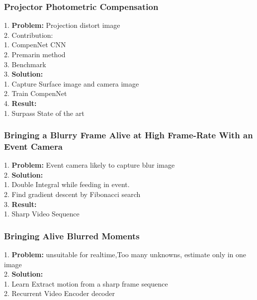 \subsubsection{Projector Photometric Compensation}
    1. {\bf Problem:} Projection distort image \\
    2. Contribution:  \\
        1. CompenNet CNN \\
        2. Premarin method \\
        3. Benchmark \\
    3. {\bf Solution:} \\
        1. Capture Surface image and camera image \\
        2. Train CompenNet \\
    4. {\bf Result:} \\
        1. Surpass State of the art \\
\subsubsection{Bringing a Blurry Frame Alive at High Frame-Rate With an Event Camera}
    1. {\bf Problem:} Event camera likely to capture blur image \\
    2. {\bf Solution:}  \\
        1. Double Integral while feeding in event. \\
        2. Find gradient descent by Fibonacci search \\
    3. {\bf Result:} \\
        1. Sharp Video Sequence \\
\subsubsection{Bringing Alive Blurred Moments}
    1. {\bf Problem:} unsuitable for realtime,Too many unknowns, estimate only in one image \\
    2. {\bf Solution:} \\
        1. Learn Extract motion from a sharp frame sequence \\
        2. Recurrent Video Encoder decoder \\
